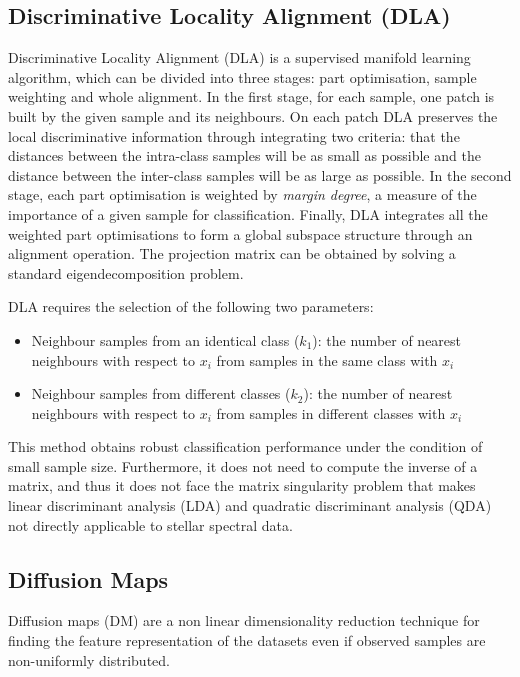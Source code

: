 \documentclass[a4paper,fleqn,usenatbib]{mnras}
\begin{document}
\subsection{Discriminative Locality Alignment (DLA)}
Discriminative Locality Alignment (DLA) \citep{zhang:2008} is a
supervised manifold learning algorithm, which can be divided into
three stages: part optimisation, sample weighting and whole
alignment. In the first stage, for each sample, one patch is built by
the given sample and its neighbours. On each patch DLA preserves the
local discriminative information through integrating two criteria:
that the distances between the intra-class samples will be as small as
possible and the distance between the inter-class samples will be as
large as possible. In the second stage, each part optimisation is
weighted by \textit{margin degree}, a measure of the importance of a
given sample for classification. Finally, DLA integrates all the
weighted part optimisations to form a global subspace structure
through an alignment operation. The projection matrix can be obtained
by solving a standard eigendecomposition problem.

DLA requires the selection of the following two parameters:
\begin{itemize}
\item Neighbour samples from an identical class ($k_1$): 
	the number of nearest neighbours with respect to $x_i$
	from samples in the same class with $x_i$
\item Neighbour samples from different classes ($k_2$): 
	the number of nearest neighbours with respect to $x_i$
	from samples in different classes with $x_i$
\end{itemize}

This method obtains robust classification performance under the
condition of small sample size. Furthermore, it does not need to
compute the inverse of a matrix, and thus it does not face the matrix
singularity problem that makes linear discriminant analysis (LDA) and
quadratic discriminant analysis (QDA) not directly applicable to
stellar spectral data.

\subsection{Diffusion Maps}

Diffusion maps (DM) \citep{coifman:06,nadler:06} are a non linear
dimensionality reduction technique for finding the feature
representation of the datasets even if observed samples are
non-uniformly distributed.
\end{document}

